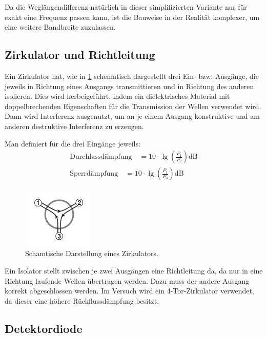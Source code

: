 \documentclass[
	a4paper,
	12pt,
	pagesize,
	ngerman
]{scrartcl}
\begin{document}
	Da die Weglängendifferenz natürlich in dieser simplifizierten Variante nur für exakt eine Frequenz passen kann, ist die Bauweise in der Realität komplexer, um eine weitere Bandbreite zuzulassen.

	\subsection{Zirkulator und Richtleitung}

	Ein Zirkulator hat, wie in \cref{fig_zirkulator} schematisch dargestellt drei Ein- bzw. Ausgänge, die jeweils in Richtung eines Ausgangs transmittieren und in Richtung des anderen isolieren.
	Dies wird herbeigeführt, indem ein dielektrisches Material mit doppelbrechenden Eigenschaften für die Transmission der Wellen verwendet wird.
	Dann wird Interferenz ausgenutzt, um an je einem Ausgang konstruktive und am anderen destruktive Interferenz zu erzeugen.

	Man definiert für die drei Eingänge jeweils:
	\begin{align}
		\text{Durchlassdämpfung} \quad = 10 \cdot \lg{ \left( \frac{P_1}{P_2} \right) } \si{\deci \bel}
		\label{eq_durchlassd}\\
		\text{Sperrdämpfung} \quad = 10 \cdot \lg{ \left( \frac{P_1}{P_3} \right) } \si{\deci \bel}
		\label{eq_sperrd}\\
	\end{align}

	\begin{figure}[H]
		\includegraphics[width=0.3\textwidth]{img/zirkulator.png}
		\centering
		\caption{
			Schamtische Darstellung eines Zirkulators. \cite{Anleitung}
		}
		\label{fig_zirkulator}
		\centering
	\end{figure}

	Ein Isolator stellt zwischen je zwei Ausgängen eine Richtleitung da, da nur in eine Richtung laufende Wellen übertragen werden.
	Dazu muss der andere Ausgang korrekt abgeschlossen werden.
	Im Versuch wird ein 4-Tor-Zirkulator verwendet, da dieser eine höhere Rückflussdämpfung besitzt.

	\subsection{Detektordiode}
\end{document}
